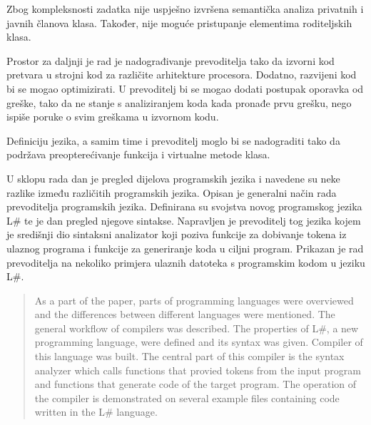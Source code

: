 \documentclass[times, utf8, zavrsni]{fer}
\begin{document}
Zbog kompleksnosti zadatka nije uspješno izvršena semantička analiza privatnih i javnih članova klasa. Također, nije moguće pristupanje elementima roditeljskih klasa.

Prostor za daljnji je rad je nadograđivanje prevoditelja tako da izvorni kod pretvara u strojni kod za različite arhitekture procesora. Dodatno, razvijeni kod bi se
mogao optimizirati. U prevoditelj bi se mogao dodati postupak oporavka od greške, tako da ne stanje s analiziranjem koda kada pronađe prvu grešku, nego ispiše poruke 
o svim greškama u izvornom kodu.

Definiciju jezika, a samim time i prevoditelj moglo bi se nadograditi tako da podržava preopterećivanje funkcija i virtualne metode klasa.




\begin{sazetak}
    U sklopu rada dan je pregled dijelova programskih jezika i navedene su neke razlike između različitih programskih jezika.
    Opisan je generalni način rada prevoditelja programskih jezika. Definirana su svojstva novog programskog jezika L\# te je dan pregled njegove sintakse.
    Napravljen je prevoditelj tog jezika kojem je središnji dio sintaksni analizator koji poziva funkcije za dobivanje tokena iz ulaznog programa i
    funkcije za generiranje koda u ciljni program. Prikazan je rad prevoditelja na nekoliko primjera ulaznih datoteka s programskim kodom u jeziku L\#.
        
\end{sazetak}

\begin{abstract}
As a part of the paper, parts of programming languages were overviewed and the differences between different languages were mentioned.
The general workflow of compilers was described. The properties of L\#, a new programming language, were defined and its syntax was given.
Compiler of this language was built. The central part of this compiler is the syntax analyzer which calls functions that provied tokens from the input program and
functions that generate code of the target program. The operation of the compiler is demonstrated on several example files containing code written
in the L\# language.

\end{abstract}
\end{document}
